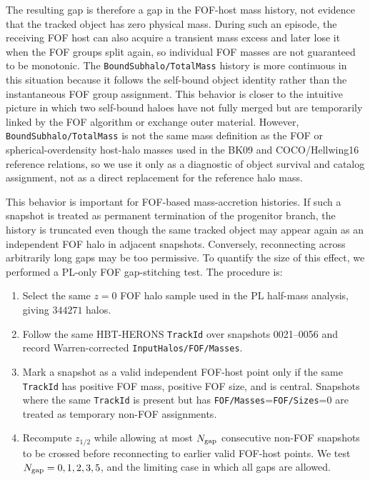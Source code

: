 \documentclass[
 reprint,
 superscriptaddress,
 nofootinbib,
 nobibnotes,
 amsmath,
 amssymb,
 aps,
 prd,
 floatfix,
 longbibliography
]{revtex4-2}
\begin{document}
The resulting gap is therefore a gap in the FOF-host mass history, not evidence that the tracked object has zero physical mass. During such an episode, the receiving FOF host can also acquire a transient mass excess and later lose it when the FOF groups split again, so individual FOF masses are not guaranteed to be monotonic. The \texttt{BoundSubhalo/TotalMass} history is more continuous in this situation because it follows the self-bound object identity rather than the instantaneous FOF group assignment. This behavior is closer to the intuitive picture in which two self-bound haloes have not fully merged but are temporarily linked by the FOF algorithm or exchange outer material. However, \texttt{BoundSubhalo/TotalMass} is not the same mass definition as the FOF or spherical-overdensity host-halo masses used in the BK09 and COCO/Hellwing16 reference relations, so we use it only as a diagnostic of object survival and catalog assignment, not as a direct replacement for the reference halo mass.

This behavior is important for FOF-based mass-accretion histories. If such a snapshot is treated as permanent termination of the progenitor branch, the history is truncated even though the same tracked object may appear again as an independent FOF halo in adjacent snapshots. Conversely, reconnecting across arbitrarily long gaps may be too permissive. To quantify the size of this effect, we performed a PL-only FOF gap-stitching test. The procedure is:

\begin{enumerate}
    \item Select the same \(z=0\) FOF halo sample used in the PL half-mass analysis, giving \(344271\) halos.
    \item Follow the same \textsc{HBT-HERONS} \texttt{TrackId} over snapshots 0021--0056 and record Warren-corrected \texttt{InputHalos/FOF/Masses}.
    \item Mark a snapshot as a valid independent FOF-host point only if the same \texttt{TrackId} has positive FOF mass, positive FOF size, and is central. Snapshots where the same \texttt{TrackId} is present but has \texttt{FOF/Masses}=\texttt{FOF/Sizes}=0 are treated as temporary non-FOF assignments.
    \item Recompute \(z_{1/2}\) while allowing at most \(N_{\rm gap}\) consecutive non-FOF snapshots to be crossed before reconnecting to earlier valid FOF-host points. We test \(N_{\rm gap}=0,1,2,3,5\), and the limiting case in which all gaps are allowed.
\end{enumerate}
\end{document}
